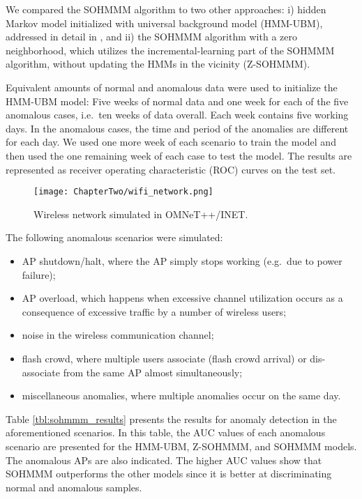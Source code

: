 We compared the SOHMMM algorithm to two other approaches: i) hidden Markov model initialized with universal background model (HMM-UBM), addressed in detail in \cite{Anisa2017}, and ii) the SOHMMM algorithm with a zero neighborhood, which utilizes the incremental-learning part of the SOHMMM algorithm, without updating the HMMs in the vicinity (Z-SOHMMM).

Equivalent amounts of normal and anomalous data were used to initialize the HMM-UBM model: Five weeks of normal data and one week for each of the five anomalous cases, i.e.\ ten weeks of data overall. Each week contains five working days. In the anomalous cases, the time and period of the anomalies are different for each day. We used one more week of each scenario to train the model and then used the one remaining week of each case to test the model. The results are represented as receiver operating characteristic (ROC) curves on the test set.

\begin{figure}[h]
    \centering
    \texttt{[image: ChapterTwo/wifi\_network.png]}
    \caption{Wireless network simulated in OMNeT++/INET.}
    \label{fig:sohmmm_wifi_network}
\end{figure}

The following anomalous scenarios were simulated:
\begin{itemize}
    \item AP shutdown/halt, where the AP simply stops working (e.g.\ due to power failure);
    \item AP overload, which happens when excessive channel utilization occurs as a consequence of excessive traffic by a number of wireless users;
    \item noise in the wireless communication channel;
    \item flash crowd, where multiple users associate (flash crowd arrival) or dis-associate from the same AP almost simultaneously;
    \item miscellaneous anomalies, where multiple anomalies occur on the same day.
\end{itemize}

Table \ref{tbl:sohmmm_results} presents the results for anomaly detection in the aforementioned scenarios. In this table, the AUC values of each anomalous scenario are presented for the HMM-UBM, Z-SOHMMM, and SOHMMM models. The anomalous APs are also indicated. The higher AUC values show that SOHMMM outperforms the other models since it is better at discriminating normal and anomalous samples.

